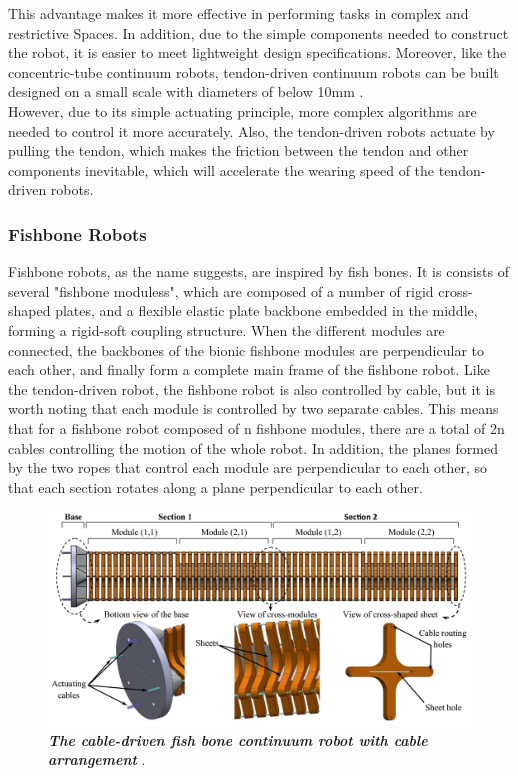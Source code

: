 This advantage makes it more effective in performing tasks in complex and restrictive Spaces. In addition, due to the simple 
components needed to construct the robot, it is easier to meet lightweight design specifications. Moreover, like the 
concentric-tube continuum robots, tendon-driven continuum robots can be built designed on a small scale with diameters of 
below 10mm \cite{amanov2021tendon}. \\
However, due to its simple actuating principle, more complex algorithms are needed to control it more accurately. Also, the 
tendon-driven robots actuate by pulling the tendon, which makes the friction between the tendon and other components inevitable, 
which will accelerate the wearing speed of the tendon-driven robots.
\subsubsection{Fishbone Robots}
Fishbone robots, as the name suggests, are inspired by fish bones. It is consists of several "fishbone moduless", which are 
composed of a number of rigid cross-shaped plates, and a flexible elastic plate backbone embedded in the middle, 
forming a rigid-soft coupling structure\cite{fishboneCR}. When the different modules are connected, the backbones of the bionic fishbone modules 
are perpendicular to each other, and finally form a complete main frame of the fishbone robot. Like the tendon-driven robot, 
the fishbone robot is also controlled by cable, but it is worth noting that each module is controlled by two separate 
cables. This means that for a fishbone robot composed of n fishbone modules, there are a total of 2n cables controlling the motion
of the whole robot. In addition, the planes formed by the two ropes that control each module are perpendicular to each other, so 
that each section rotates along a plane perpendicular to each other. 
\begin{figure}[H] %
    \centering %
    \captionsetup{labelsep=colon}
    \includegraphics[width=.9\textwidth]{Image/LR/fishbone_CR_amouri2023bio.PNG} 
    \caption[The cable-driven fish bone continuum robot]
    {\centering \textit{\textbf{The cable-driven fish bone continuum robot with cable arrangement}} \cite{amouri2023bio}.}
    \label{fig:fishboneCR_2023bio}
\end{figure}
